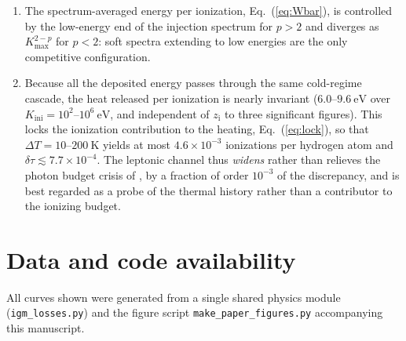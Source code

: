 \documentclass[twocolumn]{article}
\newcommand{\Ke}{K_{\mathrm{e}}}
\newcommand{\Kini}{K_{\mathrm{ini}}}
\newcommand{\zi}{z_{\mathrm{i}}}
\begin{document}
\begin{enumerate}
      $K_1 < \Ke < K_2$ (direct collisional ionization) and
      $K_3 < \Ke < K_4$ (photon-mediated, absorbed locally) --- separated by
      a dead band $K_2 < \Ke < K_3$ in which the up-scattered photons are
      sub-ionizing.
\item The spectrum-averaged energy per ionization, Eq.~(\ref{eq:Wbar}), is
      controlled by the low-energy end of the injection spectrum for
      $p > 2$ and diverges as $K_{\max}^{2-p}$ for $p < 2$: soft spectra
      extending to low energies are the only competitive configuration.
\item Because all the deposited energy passes through the same cold-regime
      cascade, the heat released per ionization is nearly invariant
      ($6.0$--$9.6\ \mathrm{eV}$ over $\Kini = 10^{2}$--$10^{6}\ \mathrm{eV}$,
      and independent of $\zi$ to three significant figures). This locks the
      ionization contribution to the heating, Eq.~(\ref{eq:lock}), so that
      $\Delta T = 10$--$200\ \mathrm{K}$ yields at most
      $4.6\times10^{-3}$ ionizations per hydrogen atom and
      $\delta\tau \lesssim 7.7\times10^{-4}$. The leptonic channel thus
      \emph{widens} rather than relieves the photon budget crisis of
      \citet{Munoz2024}, by a fraction of order $10^{-3}$ of the
      discrepancy, and is best regarded as a probe of the thermal history
      rather than a contributor to the ionizing budget.
\end{enumerate}

\section*{Data and code availability}

All curves shown were generated from a single shared physics module
(\texttt{igm\_losses.py}) and the figure script \texttt{make\_paper\_figures.py}
accompanying this manuscript.


\end{document}
